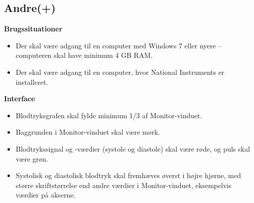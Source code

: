 \subsection{Andre(+)}
\textbf{Brugssituationer}
\begin{itemize}
	\item Der skal være adgang til en computer med Windows 7 eller nyere – computeren skal have minimum 4 GB RAM.
	\item Der skal være adgang til en computer, hvor National Instruments er installeret.
\end{itemize}
\textbf{Interface}
\begin{itemize}
	\item Blodtryksgrafen skal fylde minimum 1/3 af Monitor-vinduet.
	\item Baggrunden i Monitor-vinduet skal være mørk.
	\item Blodtrykssignal og -værdier (systole og diastole) skal være røde, og puls skal være grøn.
	\item Systolisk og diastolisk blodtryk skal fremhæves øverst i højre hjørne, med større skriftstørrelse end andre værdier i Monitor-vinduet, eksempelvis værdier på akserne.
\end{itemize}

